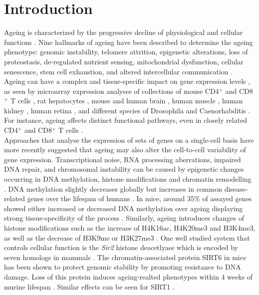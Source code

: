 
\section{Introduction}

Ageing is characterized by the progressive decline of physiological and cellular functions \citep{Lopez-Otin2013, Booth2016}. Nine hallmarks of ageing have been described to determine the ageing phenotype: genomic instability, telomere attrition, epigenetic alterations, loss of proteostasis, de-regulated nutrient sensing, mitochondrial dysfunction, cellular senescence, stem cell exhaustion, and altered intercellular communication \citep{Lopez-Otin2013}. Ageing can have a complex and tissue-specific impact on gene expression levels \citep{Zahn2007}, as seen by microarray expression analyses of collections of mouse CD4$^+$ and CD8$^+$ T cells \citep{Mirza2011}, rat hepatocytes \citep{Tollet-Egnell2000}, mouse and human brain \citep{Lu2004, Lee2000}, human muscle \citep{Welle2003, Zahn2006}, human kidney \citep{Rodwell2004}, human retina \citep{Yoshida2002}, and different species of Drosophila and Caenorhabditis \citep{Mccarroll2004}. For instance, ageing affects distinct functional pathways, even in closely related CD4$^+$ and CD8$^+$ T cells \citep{Mirza2011}. \\

Approaches that analyse the expression of sets of genes on a single-cell basis have more recently suggested that ageing may also alter the cell-to-cell variability of gene expression. Transcriptional noise, RNA processing aberrations, impaired DNA repair, and chromosomal instability can be caused by epigenetic changes occurring in DNA methylation, histone modifications and chromatin remodelling \citep{Lopez-Otin2013}. DNA methylation slightly decreases globally but increases in common disease-related genes over the lifespan of humans \citep{Talens2012}. In mice, around 35\% of assayed genes showed either increased or decreased DNA methylation over ageing displaying strong tissue-specificity of the process \citep{Maegawa2010}. Similarly, ageing introduces changes of histone modifications such as the increase of H4K16ac, H4K20me3 and H3K4me3, as well as the decrease of H3K9me or H3K27me3 \citep{Han2012, Fraga2007}. One well studied system that controls cellular function is the \emph{Sir2} histone deacetlyase which is encoded by seven homologs in mammals \citep{Houtkooper2016}. The chromatin-associated protein SIRT6 in mice has been shown to protect genomic stability by promoting resistance to DNA damage. Loss of this protein induces ageing-realted phenotypes within 4 weeks of murine lifespan \cite{Mostoslavsky2006}. Similar effects can be seen for SIRT1 \cite{Oberdoerffer2008}.\\

